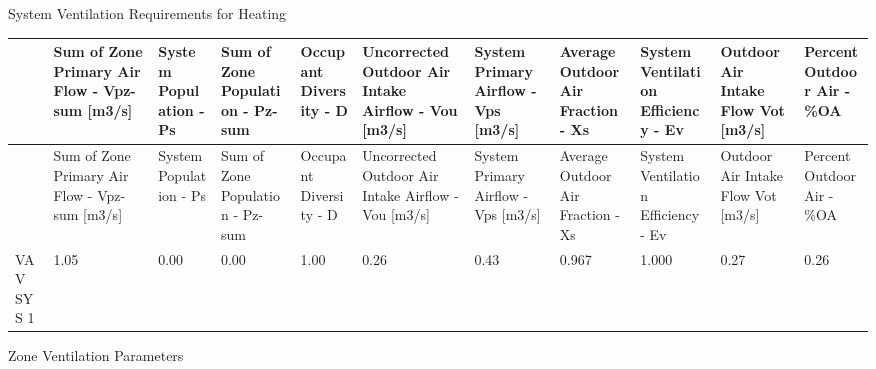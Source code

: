 System Ventilation Requirements for Heating

{\scriptsize
\begin{longtable}[c]{>{\raggedright}p{0.54in}>{\raggedright}p{0.54in}>{\raggedright}p{0.54in}>{\raggedright}p{0.54in}>{\raggedright}p{0.54in}>{\raggedright}p{0.54in}>{\raggedright}p{0.54in}>{\raggedright}p{0.54in}>{\raggedright}p{0.54in}>{\raggedright}p{0.54in}>{\raggedright}p{0.54in}}
\toprule 
 & Sum of Zone Primary Air Flow - Vpz-sum [m3/s] & System Population - Ps & Sum of Zone Population - Pz-sum & Occupant Diversity - D & Uncorrected Outdoor Air Intake Airflow - Vou [m3/s] & System Primary Airflow - Vps [m3/s] & Average Outdoor Air Fraction - Xs & System Ventilation Efficiency - Ev & Outdoor Air Intake Flow Vot [m3/s] & Percent Outdoor Air - \%OA \tabularnewline
\midrule
\endfirsthead

\toprule 
 & Sum of Zone Primary Air Flow - Vpz-sum [m3/s] & System Population - Ps & Sum of Zone Population - Pz-sum & Occupant Diversity - D & Uncorrected Outdoor Air Intake Airflow - Vou [m3/s] & System Primary Airflow - Vps [m3/s] & Average Outdoor Air Fraction - Xs & System Ventilation Efficiency - Ev & Outdoor Air Intake Flow Vot [m3/s] & Percent Outdoor Air - \%OA \tabularnewline
\midrule
\endhead

VAV SYS 1 & 1.05 & 0.00 & 0.00 & 1.00 & 0.26 & 0.43 & 0.967 & 1.000 & 0.27 & 0.26 \tabularnewline
\bottomrule
\end{longtable}}

Zone Ventilation Parameters

